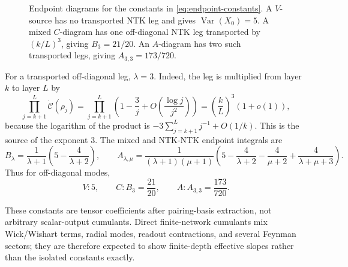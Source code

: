 \documentclass{article}
\newcommand{\Var}{\operatorname{Var}}
\begin{document}
\begin{figure}[t]
{
}
\caption{Endpoint diagrams for the constants in \eqref{eq:endpoint-constants}. A \(V\)-source has no transported NTK leg and gives \(\Var(X_0)=5\). A mixed \(C\)-diagram has one off-diagonal NTK leg transported by \((k/L)^3\), giving \(B_3=21/20\). An \(A\)-diagram has two such transported legs, giving \(A_{3,3}=173/720\).}
\label{fig:endpoint-constant-diagrams}
\end{figure}
For a transported off-diagonal leg, \(\lambda=3\). Indeed, the leg is multiplied from layer \(k\) to layer \(L\) by
\[
\prod_{j=k+1}^{L}\dot{\mathcal C}(\rho_j)
=\prod_{j=k+1}^{L}\left(1-\frac3j+O\left(\frac{\log j}{j^2}\right)\right)
=\left(\frac{k}{L}\right)^3(1+o(1)),
\]
because the logarithm of the product is \(-3\sum_{j=k+1}^{L}j^{-1}+O(1/k)\). This is the source of the exponent \(3\). The mixed and NTK-NTK endpoint integrals are
\begin{equation}
B_\lambda=\frac1{\lambda+1}\left(5-\frac4{\lambda+2}\right),
\qquad
A_{\lambda,\mu}=\frac{1}{(\lambda+1)(\mu+1)}\left(5-\frac4{\lambda+2}-\frac4{\mu+2}+\frac4{\lambda+\mu+3}\right).
\end{equation}
Thus for off-diagonal modes,
\begin{equation}
V: 5,
\qquad
C: B_3=\frac{21}{20},
\qquad
A: A_{3,3}=\frac{173}{720}.
\label{eq:endpoint-constants}
\end{equation}

These constants are tensor coefficients after pairing-basis extraction, not arbitrary scalar-output cumulants. Direct finite-network cumulants mix Wick/Wishart terms, radial modes, readout contractions, and several Feynman sectors; they are therefore expected to show finite-depth effective slopes rather than the isolated constants exactly.
\end{document}
